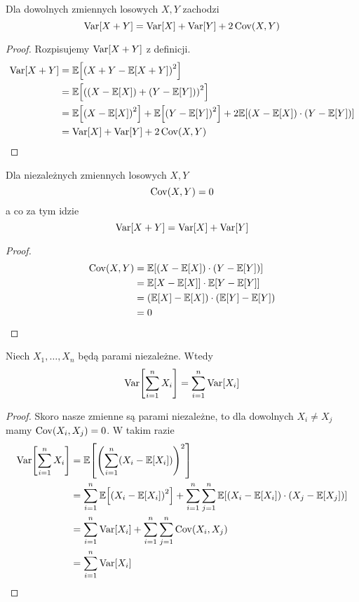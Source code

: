 \begin{theorem}
    Dla dowolnych zmiennych losowych \( X, Y \) zachodzi
    \[
        \variance{X + Y} = \variance{X} + \variance{Y} + 2\covariance{X}{Y}
    \]
\end{theorem}
\begin{proof}
    Rozpisujemy \( \variance{X + Y} \) z definicji.
    \begin{align*}
        \variance{X + Y} 
            &= \expected{\pars{X + Y - \expected{X + Y}}^2} \\
            &= \expected{\pars{\pars{X - \expected{X}} + \pars{Y - \expected{Y}}}^2} \\
            &= \expected{\pars{X - \expected{X}}^2} + \expected{\pars{Y - \expected{Y}}^2}
                + 2\expected{\pars{X - \expected{X}}\cdot\pars{Y - \expected{Y}}} \\
            &= \variance{X} + \variance{Y} + 2\covariance{X}{Y}
    \end{align*}
\end{proof}

\begin{theorem} Dla niezależnych zmiennych losowych \( X, Y \)
    \[
        \covariance{X}{Y} = 0
    \]
    a co za tym idzie
    \[
        \variance{X + Y} = \variance{X} + \variance{Y}
    \]
\end{theorem}
\begin{proof}
    \begin{align*}
        \covariance{X}{Y} 
            &= \expected{\pars{X - \expected{X}} \cdot \pars{Y - \expected{Y}}} \\
            &= \expected{X - \expected{X}} \cdot \expected{Y - \expected{Y}} \\
            &= \pars{\expected{X} - \expected{X}} \cdot \pars{\expected{Y} - \expected{Y}} \\
            &= 0
    \end{align*}
\end{proof}

\begin{theorem}
    \label{variance-of-sum-of-independent-variables}
    Niech \( X_1, \dots, X_n \) będą parami niezależne. Wtedy
    \[
        \variance{\sum_{i=1}^n X_i} = \sum_{i=1}^n \variance{X_i}
    \]
\end{theorem}
\begin{proof}
    Skoro nasze zmienne są parami niezależne, to dla dowolnych \( X_i \neq X_j \) mamy \( \covariance{X_i}{X_j} = 0 \). W takim razie
    \begin{align*}
        \variance{\sum_{i=1}^n X_i}
            &= \expected{\pars{\sum_{i=1}^n \pars{X_i - \expected{X_i}}}^2} \\
            &= \sum_{i=1}^n \expected{\pars{X_i - \expected{X_i}}^2} 
            + \sum_{i=1}^n \sum_{j=1}^n \expected{\pars{X_i - \expected{X_i}}\cdot\pars{X_j - \expected{X_j}}} \\
            &= \sum_{i=1}^n \variance{X_i} + \sum_{i=1}^n \sum_{j=1}^n \covariance{X_i}{X_j} \\
            &= \sum_{i=1}^n \variance{X_i}
    \end{align*}
\end{proof}


